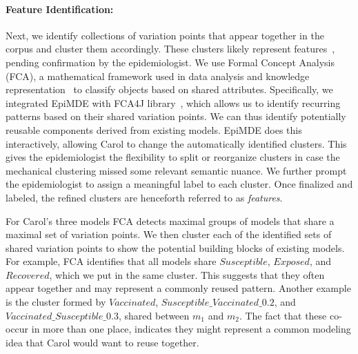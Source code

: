 \paragraph{Feature Identification:} 
Next, we identify collections of variation points that appear together in the corpus and cluster them accordingly. 
These clusters likely represent features~\cite{berger2015feature}, pending confirmation by the epidemiologist.
We use Formal Concept Analysis (FCA), a mathematical framework used in data analysis and knowledge representation~\cite{ganter2012formal}
to classify objects based on shared attributes. 
Specifically, we integrated EpiMDE with FCA4J library~\cite{gutierrez2022fca4j}, 
which allows us to identify recurring patterns based on their shared variation points.%
We can thus identify potentially reusable components derived from existing models.
%
EpiMDE does this interactively, allowing Carol to change the automatically identified clusters.
This gives the epidemiologist the flexibility to split or reorganize clusters in case the mechanical clustering missed some relevant semantic nuance.
We further prompt the epidemiologist to assign a meaningful label to each cluster. 
Once finalized and labeled, the refined clusters are henceforth referred to as \textit{features}. 


For Carol's three models
FCA detects maximal groups of models that share a maximal set of variation points. 
We then cluster each of the identified sets of shared variation points to show the potential building blocks of existing models. 
For example, FCA identifies that all models share $Susceptible$, $Exposed$, and $Recovered$, which we put in the same cluster. 
This suggests that they often appear together and may represent a commonly reused pattern. 
Another example is the cluster formed by $Vaccinated$, $Susceptible\_Vaccinated\_0.2$, and $Vaccinated\_Susceptible\_0.3$, shared between $m_1$ and $m_2$. 
The fact that these co-occur in more than one place, indicates they might represent a common modeling idea that Carol would want to reuse together.

